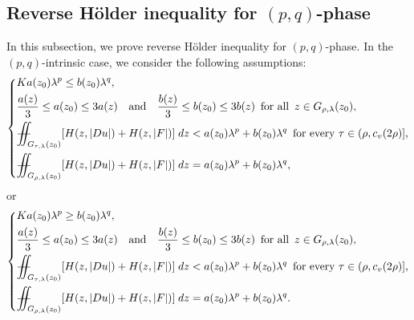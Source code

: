 \documentclass[11pt,oneside, english,reqno,twoside a4paper]{amsart}
\theoremstyle{definition}
\numberwithin{theorem}{section}
\numberwithin{equation}{section}
\newcommand{\la}{\lambda}
\newcommand{\iintss}{{\int\hspace{-0.28cm}\int}}
\newcommand{ \miints }{{\iintss\hspace{-0.56cm} -\hspace{-0.15cm}-}}
\newcommand{\miint}[1]{{\miints_{\hspace{-0.13cm}#1}}}
\begin{document}
\subsection{Reverse H\"{o}lder inequality for $(p, q)$-phase} In this subsection, we prove reverse H\"{o}lder inequality for $(p,q)$-phase. In the $(p, q)$-intrinsic case, we consider the following assumptions:                                                  
\begin{equation}\label{Eq 3.8}    
    \left\{
    \begin{aligned}
        &Ka(z_0)\lambda^p \leq b(z_0)\lambda^q,\\
        &\frac{a(z)}{3}\leq a(z_0)\leq 3a(z) \quad \text{and}\quad \frac{b(z)}{3}\leq b(z_0)\leq 3b(z) \ \, \text{for all}\,\,\, z\in G_{\rho, \la}(z_0),\\
        &\miint{G_{\tau,\lambda}(z_0)} [H(z,|Du|)+H(z,|F|)] \; dz <a(z_0)\lambda^p+b(z_0)\lambda^q \ \, \text{for every }\tau\in(\rho,c_v(2\rho)],\\
        &\miint{G_{\rho,\lambda}(z_0)} [H(z,|Du|)+H(z,|F|)] \; dz =a(z_0)\lambda^p+b(z_0)\lambda^q,
    \end{aligned}
    \right.
\end{equation}
or
\begin{equation}\label{Eq 3.9}    
    \left\{
    \begin{aligned}
        &Ka(z_0)\lambda^p \geq b(z_0)\lambda^q,\\
        &\frac{a(z)}{3}\leq a(z_0)\leq 3a(z) \quad \text{and}\quad \frac{b(z)}{3}\leq b(z_0)\leq 3b(z) \ \, \text{for all}\,\,\, z\in G_{\rho, \la}(z_0),\\
        &\miint{G_{\tau,\lambda}(z_0)} [H(z,|Du|)+H(z,|F|)] \; dz <a(z_0)\lambda^p+b(z_0)\lambda^q \ \, \text{for every }\tau\in(\rho,c_v(2\rho)],\\
        &\miint{G_{\rho,\lambda}(z_0)} [H(z,|Du|)+H(z,|F|)] \; dz =a(z_0)\lambda^p+b(z_0)\lambda^q.
    \end{aligned}
    \right.
\end{equation}
\end{document}
